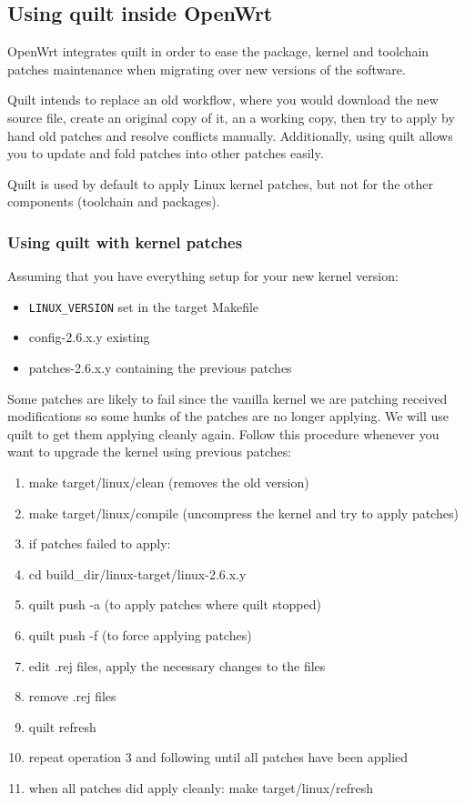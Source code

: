 \subsection{Using quilt inside OpenWrt}

OpenWrt integrates quilt in order to ease the package, kernel and toolchain
patches maintenance when migrating over new versions of the software.

Quilt intends to replace an old workflow, where you would download the new
source file, create an original copy of it, an a working copy, then try to
apply by hand old patches and resolve conflicts manually. Additionally, using
quilt allows you to update and fold patches into other patches easily.

Quilt is used by default to apply Linux kernel patches, but not for the other
components (toolchain and packages).

\subsubsection{Using quilt with kernel patches}

Assuming that you have everything setup for your new kernel version:
\begin{itemize}
\item \texttt{LINUX\_VERSION} set in the target Makefile
\item config-2.6.x.y existing
\item patches-2.6.x.y containing the previous patches
\end{itemize}

Some patches are likely to fail since the vanilla kernel we are patching
received modifications so some hunks of the patches are no longer applying.
We will use quilt to get them applying cleanly again. Follow this procedure
whenever you want to upgrade the kernel using previous patches:

\begin{enumerate}
\item make target/linux/clean (removes the old version)
\item make target/linux/compile (uncompress the kernel and try to apply patches)
\item if patches failed to apply:
\item cd build\_dir/linux-target/linux-2.6.x.y
\item quilt push -a (to apply patches where quilt stopped)
\item quilt push -f (to force applying patches)
\item edit .rej files, apply the necessary changes to the files
\item remove .rej files
\item quilt refresh
\item repeat operation 3 and following until all patches have been applied
\item when all patches did apply cleanly: make target/linux/refresh
\end{enumerate}

